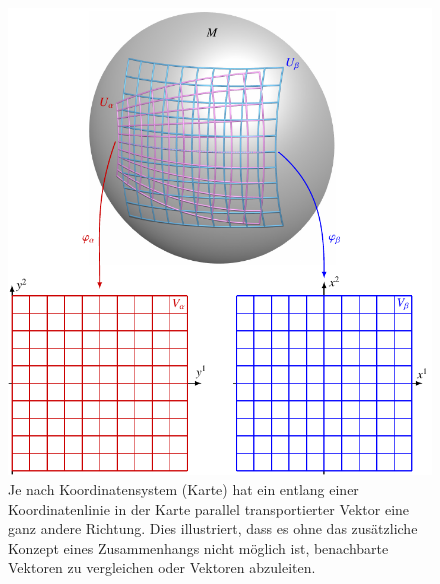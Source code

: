 %
%
%
\begin{figure}
\centering
\includegraphics{chapters/020-koordinaten/images/parallel.pdf}
\caption{Je nach Koordinatensystem (Karte) hat ein entlang einer
Koordinatenlinie in der Karte parallel transportierter Vektor
eine ganz andere Richtung.
Dies illustriert, dass es ohne das zusätzliche Konzept eines
Zusammenhangs nicht möglich ist, benachbarte Vektoren zu vergleichen
oder Vektoren abzuleiten.
\label{buch:koordinaten:diffop:fig:transport}}
\end{figure}
